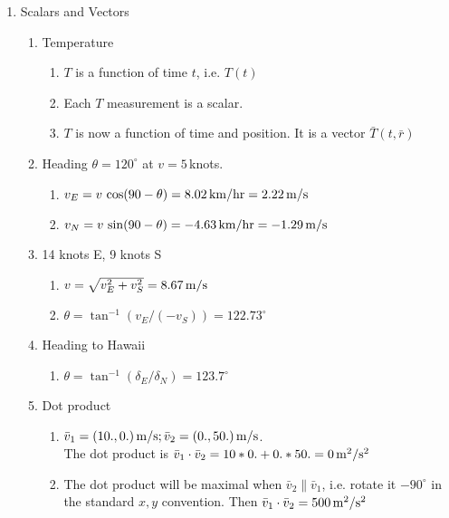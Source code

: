 \documentclass[11pt,letterpaper]{article}
\begin{document}
\begin{enumerate}
\begin{enumerate}
\end{enumerate}

\item Scalars and Vectors

\begin{enumerate}
  \item Temperature
  \begin{enumerate}
    \item $T$ is a function of time $t$, i.e. $T(t)$
    \item Each $T$ measurement is a scalar.  
    \item $T$ is now a function of time and position.  It is a vector $\bar T(t, \bar r)$
  \end{enumerate}

  \item Heading $\theta = 120^\circ$ at $v = 5$\,knots.
  \begin{enumerate}
    \item $v_E = v \, \cos(90-\theta) = 8.02 \, \rm km/hr = 2.22 \, \rm m/s$
    \item $v_N = v \, \sin(90-\theta) = -4.63 \, \rm km/hr = -1.29 \, \rm m/s$
  \end{enumerate}

  \item 14 knots E, 9 knots S
  \begin{enumerate}
    \item $v = \sqrt{v_E^2 + v_S^2} = 8.67 \, \rm m/s$
    \item $\theta = \tan^{-1}(v_E/(-v_S)) = 122.73^\circ$
  \end{enumerate}

  \item Heading to Hawaii
  \begin{enumerate}
    \item $\theta = \tan^{-1}(\delta_E/\delta_N) = 123.7^\circ$
  \end{enumerate}

  \item Dot product
  \begin{enumerate}
    \item $\bar v_1 = (10., 0.) \, {\rm m/s}; \bar v_2 = (0., 50.) \, {\rm m/s}$.  \\
    The dot product is $\bar v_1 \cdot \bar v_2 = 10*0. + 0.*50. = 0 \, \rm m^2/s^2$
    \item The dot product will be maximal when $\bar v_2 \parallel \bar v_1$, i.e. rotate it $-90^\circ$
    in the standard $x,y$ convention.  Then $\bar v_1 \cdot \bar v_2 = 500 \, \rm m^2/s^2$
  \end{enumerate}


\end{enumerate}
\end{enumerate}
\end{document}
